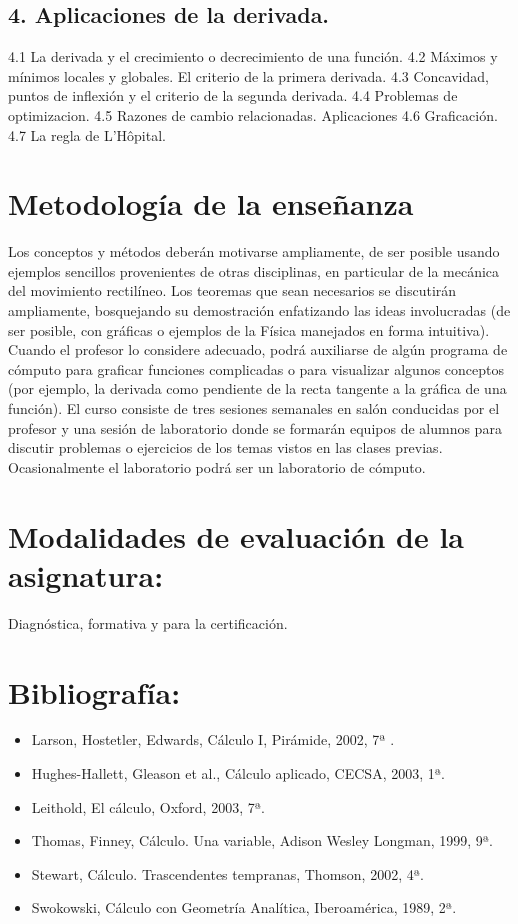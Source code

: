 \documentclass[]{book}
\begin{document}
\subsection*{4. Aplicaciones de la derivada. }

4.1 La derivada y el crecimiento o decrecimiento de una función. 4.2
Máximos y mínimos locales y globales. El criterio de la primera
derivada. 4.3 Concavidad, puntos de inflexión y el criterio de la
segunda derivada. 4.4 Problemas de optimizacion. 4.5 Razones de cambio
relacionadas. Aplicaciones 4.6 Graficación. 4.7 La regla de L'Hôpital.

\section*{Metodología de la enseñanza}

Los conceptos y métodos deberán motivarse ampliamente, de ser posible
usando ejemplos sencillos provenientes de otras disciplinas, en
particular de la mecánica del movimiento rectilíneo. Los teoremas que
sean necesarios se discutirán ampliamente, bosquejando su demostración
enfatizando las ideas involucradas (de ser posible, con gráficas o
ejemplos de la Física manejados en forma intuitiva). Cuando el profesor
lo considere adecuado, podrá auxiliarse de algún programa de cómputo
para graficar funciones complicadas o para visualizar algunos conceptos
(por ejemplo, la derivada como pendiente de la recta tangente a la
gráfica de una función). El curso consiste de tres sesiones semanales en
salón conducidas por el profesor y una sesión de laboratorio donde se
formarán equipos de alumnos para discutir problemas o ejercicios de los
temas vistos en las clases previas. Ocasionalmente el laboratorio podrá
ser un laboratorio de cómputo.

\section*{Modalidades de evaluación de la asignatura: }

Diagnóstica, formativa y para la certificación.

\section*{Bibliografía: }

\begin{itemize}
\item
  Larson, Hostetler, Edwards, Cálculo I, Pirámide, 2002, 7ª .
\item
  Hughes-Hallett, Gleason et al., Cálculo aplicado, CECSA, 2003, 1ª.\\
\item
  Leithold, El cálculo, Oxford, 2003, 7ª.
\item
  Thomas, Finney, Cálculo. Una variable, Adison Wesley Longman, 1999,
  9ª.
\item
  Stewart, Cálculo. Trascendentes tempranas, Thomson, 2002, 4ª.
\item
  Swokowski, Cálculo con Geometría Analítica, Iberoamérica, 1989, 2ª.
\end{itemize}
\end{document}
